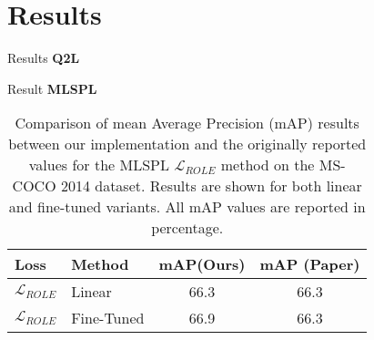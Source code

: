 \section{Results}

\begin{frame}{Results}
  \textbf{Q2L}
  \begin{table}
      \centering
        \caption{\small Mean Average Precision (mAP) comparison between our reproduced results and the Q2L paper on MS-COCO 2014. All values in percentage.}
  \end{table}
\end{frame}

\begin{frame}{Result}
  \textbf{MLSPL}
  \begin{table}[H]
      \caption{Comparison of mean Average Precision (mAP) results between our implementation and the originally reported values for the MLSPL $\mathcal{L}_{ROLE}$ method on the MS-COCO 2014 dataset. Results are shown for both linear and fine-tuned variants. All mAP values are reported in percentage.}
      \label{tab:MLSPL_map_comparison}
      \centering
      \begin{tabular}{l l c c}
      \toprule
      \textbf{Loss} & \textbf{Method} & \textbf{mAP(Ours)} & \textbf{mAP (Paper)} \\
      \midrule
      $\mathcal{L}_{ROLE}$ & Linear & 66.3 & 66.3 \\
      $\mathcal{L}_{ROLE}$ & Fine-Tuned & 66.9 & 66.3 \\
      \bottomrule
      \end{tabular}
  \end{table}
\end{frame}
